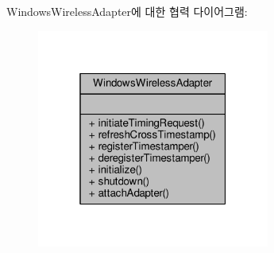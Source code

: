 Windows\+Wireless\+Adapter에 대한 협력 다이어그램\+:
\nopagebreak
\begin{figure}[H]
\begin{center}
\leavevmode
\includegraphics[width=217pt]{class_windows_wireless_adapter__coll__graph}
\end{center}
\end{figure}
